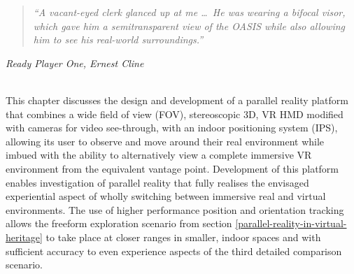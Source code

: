 \begin{quote}
	\textit{``A vacant-eyed clerk glanced up at me \ldots\ He was wearing a bifocal visor, which gave him a semitransparent view of the OASIS while also allowing him to see his real-world surroundings.''}%
\end{quote}
\hfill \textit{Ready Player One, Ernest Cline}
\\
\\


\label{chapter-mirrorshades}

This chapter discusses the design and development of a parallel reality platform that combines a wide field of view (FOV), stereoscopic 3D, VR HMD modified with cameras for video see-through, with an indoor positioning system (IPS), allowing its user to observe and move around their real environment while imbued with the ability to alternatively view a complete immersive VR environment from the equivalent vantage point. Development of this platform enables investigation of parallel reality that fully realises the envisaged experiential aspect of wholly switching between immersive real and virtual environments. The use of higher performance position and orientation tracking allows the freeform exploration scenario from section \ref{parallel-reality-in-virtual-heritage} to take place at closer ranges in smaller, indoor spaces and with sufficient accuracy to even experience aspects of the third detailed comparison scenario.



